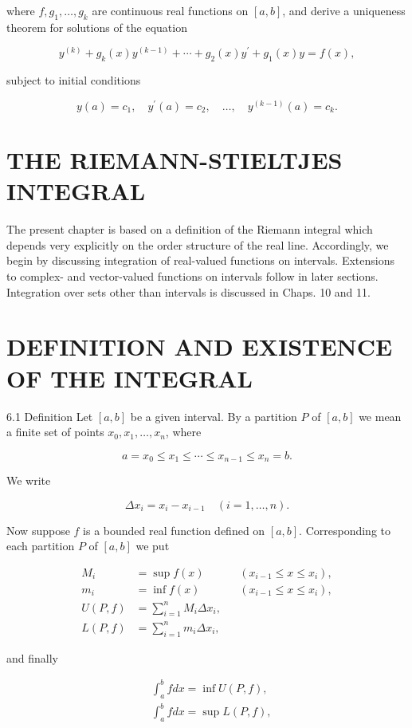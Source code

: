 \documentclass[10pt]{article}
\begin{document}
where $f, g_{1}, \ldots, g_{k}$ are continuous real functions on $[a, b]$, and derive a uniqueness theorem for solutions of the equation

$$
y^{(k)}+g_{k}(x) y^{(k-1)}+\cdots+g_{2}(x) y^{\prime}+g_{1}(x) y=f(x),
$$

subject to initial conditions

$$
y(a)=c_{1}, \quad y^{\prime}(a)=c_{2}, \quad \ldots, \quad y^{(k-1)}(a)=c_{k} .
$$

\section{THE RIEMANN-STIELTJES INTEGRAL}
The present chapter is based on a definition of the Riemann integral which depends very explicitly on the order structure of the real line. Accordingly, we begin by discussing integration of real-valued functions on intervals. Extensions to complex- and vector-valued functions on intervals follow in later sections. Integration over sets other than intervals is discussed in Chaps. 10 and 11.

\section{DEFINITION AND EXISTENCE OF THE INTEGRAL}
6.1 Definition Let $[a, b]$ be a given interval. By a partition $P$ of $[a, b]$ we mean a finite set of points $x_{0}, x_{1}, \ldots, x_{n}$, where

$$
a=x_{0} \leq x_{1} \leq \cdots \leq x_{n-1} \leq x_{n}=b .
$$

We write

$$
\Delta x_{i}=x_{i}-x_{i-1} \quad(i=1, \ldots, n) .
$$

Now suppose $f$ is a bounded real function defined on $[a, b]$. Corresponding to each partition $P$ of $[a, b]$ we put

$$
\begin{array}{rlrl}
M_{i} & =\sup f(x) & & \left(x_{i-1} \leq x \leq x_{i}\right), \\
m_{i} & =\inf f(x) & & \left(x_{i-1} \leq x \leq x_{i}\right), \\
U(P, f) & =\sum_{i=1}^{n} M_{i} \Delta x_{i}, & \\
L(P, f) & =\sum_{i=1}^{n} m_{i} \Delta x_{i}, &
\end{array}
$$

and finally

$$
\begin{aligned}
& \int_{a}^{b} f d x=\inf U(P, f), \\
& \int_{a}^{b} f d x=\sup L(P, f),
\end{aligned}
$$
\end{document}

